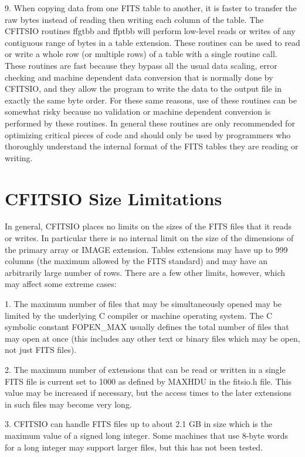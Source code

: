 9. When copying data from one FITS table to another, it is faster to
transfer the raw bytes instead of reading then writing each column of
the table.  The CFITSIO routines ffgtbb and ffptbb will perform
low-level reads or writes of any contiguous range of bytes in a table
extension.  These routines can be used to read or write a whole row (or
multiple rows) of a table with a single routine call.   These routines
are fast because they bypass all the usual data scaling, error checking
and machine dependent data conversion that is normally done by CFITSIO,
and they allow the program to write the data to the output file in
exactly the same byte order.  For these same reasons, use of these
routines can be somewhat risky because no validation or machine
dependent conversion is performed by these routines.  In general these
routines are only recommended for optimizing critical pieces of code
and should only be used by programmers who thoroughly understand the
internal format of the FITS tables they are reading or writing.


\section{CFITSIO Size Limitations}

In general, CFITSIO places no limits on the sizes of the FITS files that
it reads or writes. In particular there is no internal limit on the size of the
dimensions of the primary array or IMAGE extension. Tables extensions may have
up to 999 columns (the maximum allowed by the FITS standard) and
may have an arbitrarily large number of rows. There are a few other limits,
however, which may affect some extreme cases:

1.  The maximum number of files that may be simultaneously opened may
be limited by the underlying C compiler or machine operating system.
The C symbolic constant FOPEN\_MAX usually defines the total number of
files that may open at once (this includes any other text or binary
files which may be open, not just FITS files).

2.  The maximum number of extensions that can be read or written in a
single FITS file is current set to 1000 as defined by MAXHDU in the
fitsio.h file.  This value may be increased if necessary, but the
access times to the later extensions in such files may become very
long.

3.  CFITSIO can handle FITS files up to about 2.1 GB in size which is
the maximum value of a signed long integer.  Some machines that use
8-byte words for a long integer may support larger files, but this has
not been tested.

